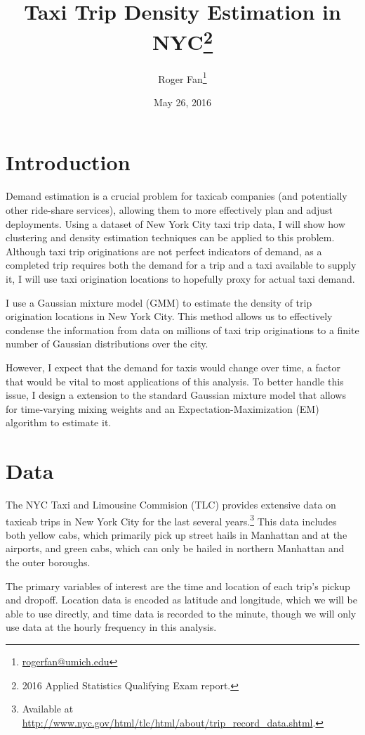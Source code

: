\documentclass[12pt]{article}
\theoremstyle{definition}
\theoremstyle{algodesc}
\begin{document}
\title{Taxi Trip Density Estimation in NYC\thanks{2016 Applied Statistics Qualifying Exam report.}}
\author{
    Roger Fan\footnote{\url{rogerfan@umich.edu}}
}
\date{May 26, 2016}

\maketitle


\section{Introduction}
Demand estimation is a crucial problem for taxicab companies (and potentially other ride-share services), allowing them to more effectively plan and adjust deployments. Using a dataset of New York City taxi trip data, I will show how clustering and density estimation techniques can be applied to this problem. Although taxi trip originations are not perfect indicators of demand, as a completed trip requires both the demand for a trip and a taxi available to supply it, I will use taxi origination locations to hopefully proxy for actual taxi demand.

I use a Gaussian mixture model (GMM) to estimate the density of trip origination locations in New York City. This method allows us to effectively condense the information from data on millions of taxi trip originations to a finite number of Gaussian distributions over the city.

However, I expect that the demand for taxis would change over time, a factor that would be vital to most applications of this analysis. To better handle this issue, I design a extension to the standard Gaussian mixture model that allows for time-varying mixing weights and an Expectation-Maximization (EM) algorithm to estimate it.


\section{Data}
The NYC Taxi and Limousine Commision (TLC) provides extensive data on taxicab trips in New York City for the last several years.\footnote{Available at \url{http://www.nyc.gov/html/tlc/html/about/trip_record_data.shtml}.} This data includes both yellow cabs, which primarily pick up street hails in Manhattan and at the airports, and green cabs, which can only be hailed in northern Manhattan and the outer boroughs.

The primary variables of interest are the time and location of each trip's pickup and dropoff. Location data is encoded as latitude and longitude, which we will be able to use directly, and time data is recorded to the minute, though we will only use data at the hourly frequency in this analysis.
\end{document}
